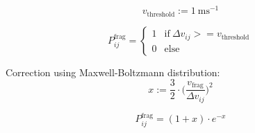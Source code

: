         
        
        \begin{equation}
            v_\text{threshold}:=\SI{1}{\meter\second^{-1}}
        \end{equation}
        
        \begin{equation}
            P^\text{frag}_{ij}
            =
            \begin{cases}
                1 & \text{if}\ \Delta v_{ij} >= v_\text{threshold}\\
                0 & \text{else}
            \end{cases}
        \end{equation}
        
        Correction using Maxwell-Boltzmann distribution:
        \begin{equation}
            x:=\frac{3}{2}\cdot\bigg(
                \frac{v_\text{frag}}{\Delta v_{ij}}
            \bigg)^2
        \end{equation}
        
        \begin{equation}
            P^\text{frag}_{ij}=(1+x)\cdot e^{-x}
        \end{equation}
        
        
        

